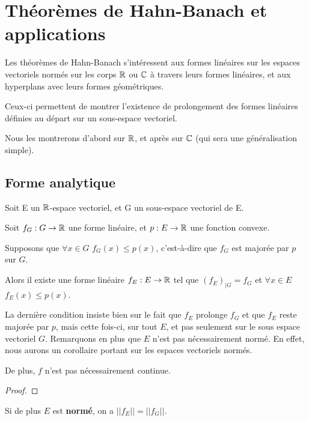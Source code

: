 \chapter{Théorèmes de Hahn-Banach et applications}

Les théorèmes de Hahn-Banach s'intéressent aux formes linéaires sur les espaces
vectoriels normés sur les corps $\mathbb{R}$ ou $\mathbb{C}$ à travers leurs formes
linéaires, et aux hyperplans avec leurs formes géométriques.

Ceux-ci permettent de montrer l'existence de prolongement des formes linéaires
définies au départ sur un sous-espace vectoriel.

Nous les montrerons d'abord sur $\mathbb{R}$, et après sur $\mathbb{C}$ (qui sera une
généralisation simple).

\section{Forme analytique}

\begin{theorem} 
\label{theorem_hahn_banach_analytic_1}
	Soit E un $\mathbb{R}$-espace vectoriel, et G un sous-espace vectoriel de E.

	Soit $f_{G} : G \rightarrow \mathbb{R}$ une forme linéaire, et
	$p : E \rightarrow \mathbb{R}$ une fonction convexe.

	Supposons que $\forall x \in G$ $f_{G}(x) \leq p(x)$, c'est-à-dire que
	$f_{G}$ est majorée par $p$ sur $G$.

	Alors il existe une forme linéaire $f_{E} : E \rightarrow \mathbb{R}$ tel que
	${(f_{E})}_{|G} = f_{G}$ et $\forall x \in E$ $f_{E}(x) \leq p(x)$.
\end{theorem}

La dernière condition insiste bien sur le fait que $f_{E}$ prolonge $f_{G}$ et
que $f_{E}$ reste majorée par $p$, mais cette fois-ci, sur tout $E$, et pas
seulement sur le sous espace vectoriel $G$.
Remarquons en plus que $E$ n'est pas nécessairement normé. En effet, nous aurons
un corollaire portant sur les espaces vectoriels normés.

De plus, $f$ n'est pas nécessairement continue.

\ifdefined\outputproof
\begin{proof}

\end{proof}
\fi

\begin{corollary}
	Si de plus $E$ est \textbf{normé}, on a $||f_{E}|| = ||f_{G}||$.
\end{corollary}

